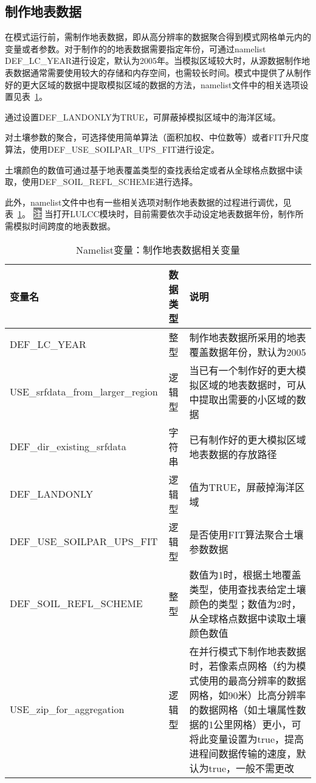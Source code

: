 \documentclass[a4paper,12pt,twoside]{article}
\begin{document}
\subsection{制作地表数据}

在模式运行前，需制作地表数据，即从高分辨率的数据聚合得到模式网格单元内的变量或者参数。对于制作的的地表数据需要指定年份，可通过namelist DEF\_LC\_YEAR进行设定，默认为2005年。当模拟区域较大时，从源数据制作地表数据通常需要使用较大的存储和内存空间，也需较长时间。模式中提供了从制作好的更大区域的数据中提取模拟区域的数据的方法，namelist文件中的相关选项设置见表~\ref{table_nl_mksrfdata}。

通过设置DEF\_LANDONLY为TRUE，可屏蔽掉模拟区域中的海洋区域。

对土壤参数的聚合，可选择使用简单算法（面积加权、中位数等）或者FIT升尺度算法，使用DEF\_USE\_SOILPAR\_UPS\_FIT进行设定。

土壤颜色的数值可通过基于地表覆盖类型的查找表给定或者从全球格点数据中读取，使用DEF\_SOIL\_REFL\_SCHEME进行选择。

此外，namelist文件中也有一些相关选项对制作地表数据的过程进行调优，见表~\ref{table_nl_mksrfdata}。
\newline
\newline
\noindent \colorbox{gray}{\textcolor{white}{\bf{注}}} 当打开LULCC模块时，目前需要依次手动设定地表数据年份，制作所需模拟时间跨度的地表数据。

\begin{table}[!htbp]
\caption{Namelist变量：制作地表数据相关变量} \label{table_nl_mksrfdata}
\centering \renewcommand{\arraystretch}{1.2}
\begin{tabular}{lcp{}}
\toprule
\textbf{变量名} & \textbf{数据类型} & \textbf{说明} \\\midrule
DEF\_LC\_YEAR & 整型 & 制作地表数据所采用的地表覆盖数据年份，默认为2005\\
USE\_srfdata\_from\_larger\_region & 逻辑型 & 当已有一个制作好的更大模拟区域的地表数据时，可从中提取出需要的小区域的数据 \\
DEF\_dir\_existing\_srfdata & 字符串 & 已有制作好的更大模拟区域地表数据的存放路径 \\
DEF\_LANDONLY & 逻辑型 & 值为TRUE，屏蔽掉海洋区域 \\
DEF\_USE\_SOILPAR\_UPS\_FIT & 逻辑型 & 是否使用FIT算法聚合土壤参数数据 \\
DEF\_SOIL\_REFL\_SCHEME & 整型 & 数值为1时，根据土地覆盖类型，使用查找表给定土壤颜色的类型；数值为2时，从全球格点数据中读取土壤颜色数值\\ 
USE\_zip\_for\_aggregation & 逻辑型 & 在并行模式下制作地表数据时，若像素点网格（约为模式使用的最高分辨率的数据网格，如90米）比高分辨率的数据网格（如土壤属性数据的1公里网格）更小，可将此变量设置为true，提高进程间数据传输的速度，默认为true，一般不需更改 \\
\bottomrule
\end{tabular} 
\end{table}
\end{document}
